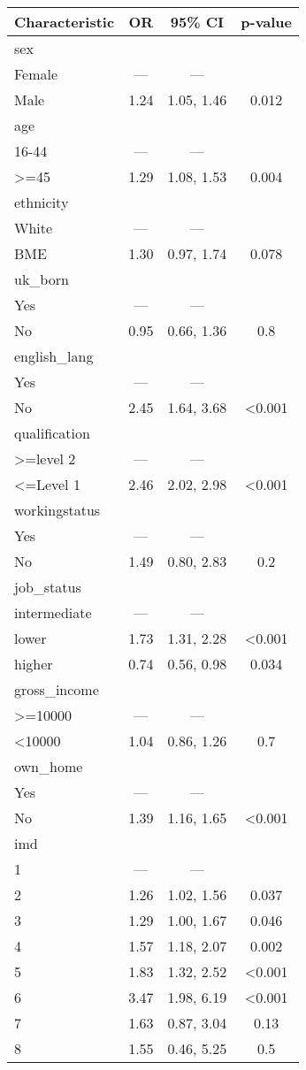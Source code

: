 \documentclass[
]{article}
\begin{document}
\begin{longtable}[]{@{}lccc@{}}
\toprule\noalign{}
\textbf{Characteristic} & \textbf{OR} & \textbf{95\% CI} &
\textbf{p-value} \\
\midrule\noalign{}
\endhead
\bottomrule\noalign{}
\endlastfoot
sex & & & \\
Female & --- & --- & \\
Male & 1.24 & 1.05, 1.46 & 0.012 \\
age & & & \\
16-44 & --- & --- & \\
\textgreater=45 & 1.29 & 1.08, 1.53 & 0.004 \\
ethnicity & & & \\
White & --- & --- & \\
BME & 1.30 & 0.97, 1.74 & 0.078 \\
uk\_born & & & \\
Yes & --- & --- & \\
No & 0.95 & 0.66, 1.36 & 0.8 \\
english\_lang & & & \\
Yes & --- & --- & \\
No & 2.45 & 1.64, 3.68 & \textless0.001 \\
qualification & & & \\
\textgreater=level 2 & --- & --- & \\
\textless=Level 1 & 2.46 & 2.02, 2.98 & \textless0.001 \\
workingstatus & & & \\
Yes & --- & --- & \\
No & 1.49 & 0.80, 2.83 & 0.2 \\
job\_status & & & \\
intermediate & --- & --- & \\
lower & 1.73 & 1.31, 2.28 & \textless0.001 \\
higher & 0.74 & 0.56, 0.98 & 0.034 \\
gross\_income & & & \\
\textgreater=10000 & --- & --- & \\
\textless10000 & 1.04 & 0.86, 1.26 & 0.7 \\
own\_home & & & \\
Yes & --- & --- & \\
No & 1.39 & 1.16, 1.65 & \textless0.001 \\
imd & & & \\
1 & --- & --- & \\
2 & 1.26 & 1.02, 1.56 & 0.037 \\
3 & 1.29 & 1.00, 1.67 & 0.046 \\
4 & 1.57 & 1.18, 2.07 & 0.002 \\
5 & 1.83 & 1.32, 2.52 & \textless0.001 \\
6 & 3.47 & 1.98, 6.19 & \textless0.001 \\
7 & 1.63 & 0.87, 3.04 & 0.13 \\
8 & 1.55 & 0.46, 5.25 & 0.5 \\
\end{longtable}
\end{document}
